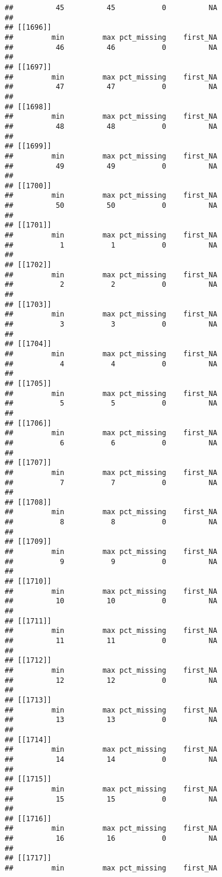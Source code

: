 \documentclass[
]{article}
\begin{document}
\begin{verbatim}
##          45          45           0          NA 
## 
## [[1696]]
##         min         max pct_missing    first_NA 
##          46          46           0          NA 
## 
## [[1697]]
##         min         max pct_missing    first_NA 
##          47          47           0          NA 
## 
## [[1698]]
##         min         max pct_missing    first_NA 
##          48          48           0          NA 
## 
## [[1699]]
##         min         max pct_missing    first_NA 
##          49          49           0          NA 
## 
## [[1700]]
##         min         max pct_missing    first_NA 
##          50          50           0          NA 
## 
## [[1701]]
##         min         max pct_missing    first_NA 
##           1           1           0          NA 
## 
## [[1702]]
##         min         max pct_missing    first_NA 
##           2           2           0          NA 
## 
## [[1703]]
##         min         max pct_missing    first_NA 
##           3           3           0          NA 
## 
## [[1704]]
##         min         max pct_missing    first_NA 
##           4           4           0          NA 
## 
## [[1705]]
##         min         max pct_missing    first_NA 
##           5           5           0          NA 
## 
## [[1706]]
##         min         max pct_missing    first_NA 
##           6           6           0          NA 
## 
## [[1707]]
##         min         max pct_missing    first_NA 
##           7           7           0          NA 
## 
## [[1708]]
##         min         max pct_missing    first_NA 
##           8           8           0          NA 
## 
## [[1709]]
##         min         max pct_missing    first_NA 
##           9           9           0          NA 
## 
## [[1710]]
##         min         max pct_missing    first_NA 
##          10          10           0          NA 
## 
## [[1711]]
##         min         max pct_missing    first_NA 
##          11          11           0          NA 
## 
## [[1712]]
##         min         max pct_missing    first_NA 
##          12          12           0          NA 
## 
## [[1713]]
##         min         max pct_missing    first_NA 
##          13          13           0          NA 
## 
## [[1714]]
##         min         max pct_missing    first_NA 
##          14          14           0          NA 
## 
## [[1715]]
##         min         max pct_missing    first_NA 
##          15          15           0          NA 
## 
## [[1716]]
##         min         max pct_missing    first_NA 
##          16          16           0          NA 
## 
## [[1717]]
##         min         max pct_missing    first_NA 

\end{verbatim}
\end{document}
